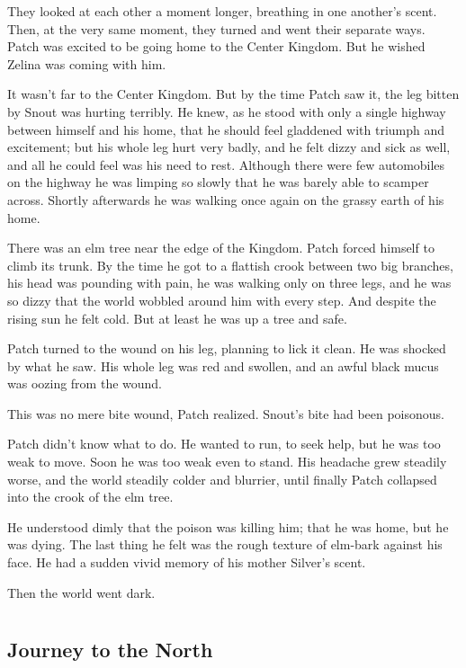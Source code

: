 \documentclass[12pt]{book}
\begin{document}
They looked at each other a moment longer, breathing in one another's scent. Then, at the very same moment, they turned and went their separate ways. Patch was excited to be going home to the Center Kingdom. But he wished Zelina was coming with him.

It wasn't far to the Center Kingdom. But by the time Patch saw it, the leg bitten by Snout was hurting terribly. He knew, as he stood with only a single highway between himself and his home, that he should feel gladdened with triumph and excitement; but his whole leg hurt very badly, and he felt dizzy and sick as well, and all he could feel was his need to rest. Although there were few automobiles on the highway he was limping so slowly that he was barely able to scamper across. Shortly afterwards he was walking once again on the grassy earth of his home.

There was an elm tree near the edge of the Kingdom. Patch forced himself to climb its trunk. By the time he got to a flattish crook between two big branches, his head was pounding with pain, he was walking only on three legs, and he was so dizzy that the world wobbled around him with every step. And despite the rising sun he felt cold. But at least he was up a tree and safe.

Patch turned to the wound on his leg, planning to lick it clean. He was shocked by what he saw. His whole leg was red and swollen, and an awful black mucus was oozing from the wound.

This was no mere bite wound, Patch realized. Snout's bite had been poisonous.

Patch didn't know what to do. He wanted to run, to seek help, but he was too weak to move. Soon he was too weak even to stand. His headache grew steadily worse, and the world steadily colder and blurrier, until finally Patch collapsed into the crook of the elm tree.

He understood dimly that the poison was killing him; that he was home, but he was dying. The last thing he felt was the rough texture of elm-bark against his face. He had a sudden vivid memory of his mother Silver's scent.

Then the world went dark.


\part{}

\chapter{Journey to the North}
\end{document}
